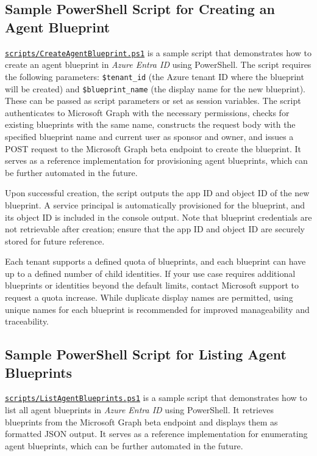 \documentclass[9pt]{extarticle}%
\begin{document}
\subsection{Sample PowerShell Script for Creating an Agent Blueprint}%
\href{https://github.com/dennisseah/agent-identity/blob/main/scripts/CreateAgentBlueprint.ps1}{\texttt{scripts/CreateAgentBlueprint.ps1}} is a sample script that demonstrates how to create an agent blueprint in \textit{Azure Entra ID} using PowerShell. The script requires the following parameters: \texttt{\$tenant\_id} (the Azure tenant ID where the blueprint will be created) and \texttt{\$blueprint\_name} (the display name for the new blueprint). These can be passed as script parameters or set as session variables. The script authenticates to Microsoft Graph with the necessary permissions, checks for existing blueprints with the same name, constructs the request body with the specified blueprint name and current user as sponsor and owner, and issues a POST request to the Microsoft Graph beta endpoint to create the blueprint. It serves as a reference implementation for provisioning agent blueprints, which can be further automated in the future.
%
\par\vspace{\baselineskip}%
Upon successful creation, the script outputs the app ID and object ID of the new blueprint. A service principal is automatically provisioned for the blueprint, and its object ID is included in the console output. Note that blueprint credentials are not retrievable after creation; ensure that the app ID and object ID are securely stored for future reference.
%
\par\vspace{\baselineskip}%
Each tenant supports a defined quota of blueprints, and each blueprint can have up to a defined number of child identities. If your use case requires additional blueprints or identities beyond the default limits, contact Microsoft support to request a quota increase. While duplicate display names are permitted, using unique names for each blueprint is recommended for improved manageability and traceability.
%
\par\vspace{\baselineskip}%
\subsection{Sample PowerShell Script for Listing Agent Blueprints}%
\href{https://github.com/dennisseah/agent-identity/blob/main/scripts/ListAgentBlueprints.ps1}{\texttt{scripts/ListAgentBlueprints.ps1}} is a sample script that demonstrates how to list all agent blueprints in \textit{Azure Entra ID} using PowerShell. It retrieves blueprints from the Microsoft Graph beta endpoint and displays them as formatted JSON output. It serves as a reference implementation for enumerating agent blueprints, which can be further automated in the future.
%
\par\vspace{\baselineskip}%
\end{document}
